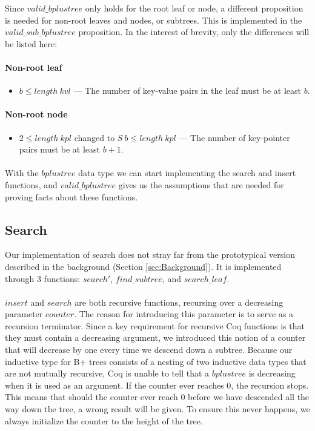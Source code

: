 Since $valid\_bplustree$ only holds for the root leaf or node, a different proposition is needed for non-root leaves and nodes, or subtrees. This is implemented in the $valid\_sub\_bplustree$ proposition. In the interest of brevity, only the differences will be listed here:

\paragraph{Non-root leaf}
\begin{itemize}
\item $b \leq length\ kvl$ --- The number of key-value pairs in the leaf must be at least $b$.
\end{itemize}

\paragraph{Non-root node}
\begin{itemize}
\item $2 \leq length\ kpl$ changed to $S\ b \leq length\ kpl$ --- The number of key-pointer pairs must be at least $b+1$.
\end{itemize}

\paragraph{}
With the $bplustree$ data type we can start implementing the search and insert functions, and $valid\_bplustree$ gives us the assumptions that are needed for proving facts about these functions.

\subsection{Search}
\label{subsec:search}
Our implementation of search does not stray far from the prototypical version described in the background (Section \ref{sec:Background}). It is implemented through 3 functions: $search'$, $find\_subtree$, and $search\_leaf$. 

\paragraph{}
$insert$ and $search$ are both recursive functions, recursing over a decreasing parameter $counter$. The reason for introducing this parameter is to serve as a recursion terminator. Since a key requirement for recursive Coq functions is that they must contain a decreasing argument, we introduced this notion of a counter that will decrease by one every time we descend down a subtree. Because our inductive type for B+ trees consists of a nesting of two inductive data types that are not mutually recursive, Coq is unable to tell that a $bplustree$ is decreasing when it is used as an argument. If the counter ever reaches $0$, the recursion stops. This means that should the counter ever reach $0$ before we have descended all the way down the tree, a wrong result will be given. To ensure this never happens, we always initialize the counter to the height of the tree.


